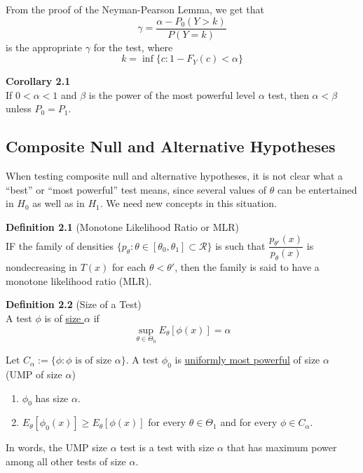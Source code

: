 \documentclass[12pt]{article}
\numberwithin{equation}{section}
\begin{document}
From the proof of the Neyman-Pearson Lemma, we get that
\begin{equation*}
  \gamma = \frac{\alpha - P_0(Y > k)}{P(Y = k)}
\end{equation*}
is the appropriate $\gamma$ for the test, where 
\begin{equation*}
  k = \inf\{c: 1 - F_Y(c) < \alpha \}
\end{equation*}

\textbf{Corollary 2.1} \\
If $0 < \alpha < 1$ and $\beta$ is the power of the most powerful level $\alpha$ test, then $\alpha < \beta$ unless $P_0 = P_1$. 


\subsection{Composite Null and Alternative Hypotheses}
When testing composite null and alternative hypotheses, it is not clear what a “best” or “most powerful” test means, since several values of $\theta$ can be entertained in $H_0$ as well as in $H_1$. We need new concepts in this situation.

\textbf{Definition 2.1} (Monotone Likelihood Ratio or MLR) \\
IF the family of densities $\{p_{\theta} : \theta \in [\theta_0, \theta_1] \subset \mathcal{R}\}$ is such that $\dfrac{p_{\theta'}(x)}{p_{\theta}(x)}$ is nondecreasing in $T(x)$ for each $\theta < \theta'$, then the family is said to have a monotone likelihood ratio (MLR).

\textbf{Definition 2.2} (Size of a Test) \\
A test $\phi$ is of \underline{size $\alpha$} if
\begin{equation*}
  \sup_{\theta \in \Theta_0} E_{\theta}[\phi(x)] = \alpha
\end{equation*}

Let $C_{\alpha} := \{ \phi : \phi \text{ is of size } \alpha\}$. A test $\phi_0$ is \underline{uniformly most powerful} of size $\alpha$ (UMP of size $\alpha$)
\begin{enumerate}
  \item $\phi_0$ has size $\alpha$. 
  \item $E_{\theta}[\phi_0(x)] \ge E_{\theta}[\phi(x)]$ for every $\theta \in \Theta_1$ and for every $\phi \in C_{\alpha}$.
\end{enumerate}
%
In words, the UMP size $\alpha$ test is a test with size $\alpha$ that has maximum power among all other tests of size $\alpha$. 
\end{document}

